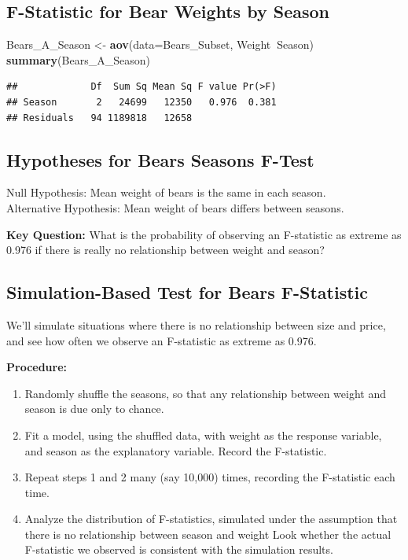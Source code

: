 \documentclass[]{book}
\newenvironment{Shaded}{\begin{snugshade}}{\end{snugshade}}
\newcommand{\KeywordTok}[1]{\textcolor[rgb]{0.13,0.29,0.53}{\textbf{#1}}}
\newcommand{\DataTypeTok}[1]{\textcolor[rgb]{0.13,0.29,0.53}{#1}}
\newcommand{\StringTok}[1]{\textcolor[rgb]{0.31,0.60,0.02}{#1}}
\newcommand{\OperatorTok}[1]{\textcolor[rgb]{0.81,0.36,0.00}{\textbf{#1}}}
\newcommand{\NormalTok}[1]{#1}
\begin{document}
\subsection{F-Statistic for Bear Weights by
Season}\label{f-statistic-for-bear-weights-by-season}

\begin{Shaded}
\begin{Highlighting}[]
\NormalTok{Bears_A_Season <-}\StringTok{ }\KeywordTok{aov}\NormalTok{(}\DataTypeTok{data=}\NormalTok{Bears_Subset, Weight}\OperatorTok{~}\NormalTok{Season)}
\KeywordTok{summary}\NormalTok{(Bears_A_Season)}
\end{Highlighting}
\end{Shaded}

\begin{verbatim}
##             Df  Sum Sq Mean Sq F value Pr(>F)
## Season       2   24699   12350   0.976  0.381
## Residuals   94 1189818   12658
\end{verbatim}

\subsection{Hypotheses for Bears Seasons
F-Test}\label{hypotheses-for-bears-seasons-f-test}

Null Hypothesis: Mean weight of bears is the same in each season.\\
Alternative Hypothesis: Mean weight of bears differs between seasons.

\textbf{Key Question:} What is the probability of observing an
F-statistic as extreme as 0.976 if there is really no relationship
between weight and season?

\subsection{Simulation-Based Test for Bears
F-Statistic}\label{simulation-based-test-for-bears-f-statistic}

We'll simulate situations where there is no relationship between size
and price, and see how often we observe an F-statistic as extreme as
0.976.

\textbf{Procedure:}

\begin{enumerate}
\def\labelenumi{\arabic{enumi}.}
\item
  Randomly shuffle the seasons, so that any relationship between weight
  and season is due only to chance.
\item
  Fit a model, using the shuffled data, with weight as the response
  variable, and season as the explanatory variable. Record the
  F-statistic.
\item
  Repeat steps 1 and 2 many (say 10,000) times, recording the
  F-statistic each time.
\item
  Analyze the distribution of F-statistics, simulated under the
  assumption that there is no relationship between season and weight
  Look whether the actual F-statistic we observed is consistent with the
  simulation results.
\end{enumerate}
\end{document}
